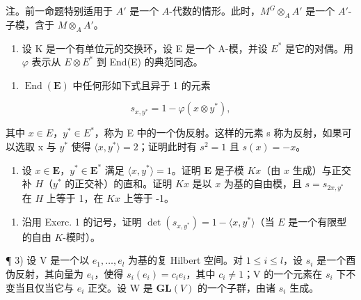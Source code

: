 注。前一命题特别适用于 \(A'\) 是一个 \(A\)-代数的情形。此时，\(M^G \otimes_A A'\) 是一个 \(A'\)-子模，含于 \(M \otimes_A A'\)。


\begin{enumerate}
\def\labelenumi{\arabic{enumi})}
\tightlist
\item
  设 K 是一个有单位元的交换环，设 E 是一个 A-模，并设 \(E^{*}\) 是它的对偶。用 \(\varphi\) 表示从 \(E \otimes E^{*}\) 到 End(E) 的典范同态。
\end{enumerate}

\begin{enumerate}
\def\labelenumi{\alph{enumi})}
\tightlist
\item
  \(\operatorname{End}(\mathbf{E})\) 中任何形如下式且异于 1 的元素
\end{enumerate}

\[
s _ {x, y ^ {*}} = 1 - \varphi (x \otimes y ^ {*}),
\]

其中 \(x \in E\)，\(y^{*} \in E^{*}\)，称为 E 中的一个伪反射。这样的元素 s 称为反射，如果可以选取 x 与 \(y^{*}\) 使得 \(\langle x, y^{*} \rangle = 2\)；证明此时有 \(s^{2} = 1\) 且 \(s(x) = -x\)。

\begin{enumerate}
\def\labelenumi{\alph{enumi})}
\setcounter{enumi}{1}
\tightlist
\item
  设 \(x \in \mathbf{E}\)，\(y^{*} \in \mathbf{E}^{*}\) 满足 \(\langle x, y^{*} \rangle = 1\)。证明 \(\mathbf{E}\) 是子模 \(Kx\)（由 \(x\) 生成）与正交补 \(H\)（\(y^{*}\) 的正交补）的直和。证明 \(Kx\) 是以 \(x\) 为基的自由模，且 \(s = s_{2x,y^*}\) 在 \(H\) 上等于 1，在 \(Kx\) 上等于 -1。
\end{enumerate}

\begin{enumerate}
\def\labelenumi{\arabic{enumi})}
\setcounter{enumi}{1}
\tightlist
\item
  沿用 Exerc. 1 的记号，证明 \(\det(s_{x,y^*}) = 1 - \langle x, y^* \rangle\)（当 \(E\) 是一个有限型的自由 \(K\)-模时）。
\end{enumerate}

¶ 3) 设 V 是一个以 \(e_1, \ldots, e_l\) 为基的复 Hilbert 空间。对 \(1 \leqslant i \leqslant l\)，设 \(s_i\) 是一个酉伪反射，其向量为 \(e_i\)，使得 \(s_i(e_i) = c_i e_i\)，其中 \(c_i \neq 1\)；V 的一个元素在 \(s_i\) 下不变当且仅当它与 \(e_i\) 正交。设 W 是 \(\mathbf{GL}(V)\) 的一个子群，由诸 \(s_i\) 生成。

